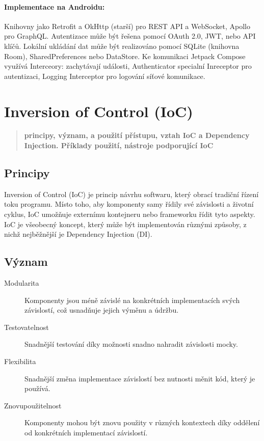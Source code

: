 \paragraph*{Implementace na Androidu:} Knihovny jako Retrofit a OkHttp (starší) pro REST API a WebSocket, 
Apollo pro GraphQL. Autentizace může být řešena pomocí OAuth 2.0, JWT, nebo API klíčů. 
Lokální ukládání dat může být realizováno pomocí SQLite (knihovna Room), 
SharedPreferences nebo DataStore. Ke komunikaci Jetpack Compose využívá
Interceory: zachytávají události, Authenticator specialní Inreceptor pro autentizaci, 
Logging Interceptor pro logování síťové komunikace.

\newpage

\section{Inversion of Control (IoC)}
\begin{quote}
\textbf{principy, význam, a použití přístupu, vztah IoC a Dependency Injection. Příklady použití, nástroje podporující IoC}
\end{quote}

\subsection{Principy}
Inversion of Control (IoC) je princip návrhu softwaru, který obrací tradiční řízení 
toku programu. Místo toho, aby komponenty samy řídily své závislosti a životní cyklus, 
IoC umožňuje externímu kontejneru nebo frameworku řídit tyto aspekty.
IoC je všeobecný koncept, který může být implementován různými způsoby, z nichž 
nejběžnější je Dependency Injection (DI).

\subsection{Význam}
\begin{description}
    \item[Modularita] Komponenty jsou méně závislé na konkrétních implementacích 
    svých závislostí, což usnadňuje jejich výměnu a údržbu.
    \item[Testovatelnost] Snadnější testování díky možnosti snadno nahradit závislosti 
    mocky.
    \item[Flexibilita] Snadnější změna implementace závislostí bez nutnosti měnit kód, který je používá.
    \item[Znovupoužitelnost] Komponenty mohou být znovu použity v různých kontextech díky oddělení od konkrétních implementací závislostí.
\end{description}

